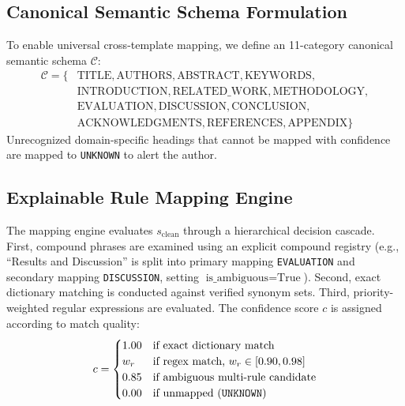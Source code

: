 \documentclass[conference]{IEEEtran}
\begin{document}
\subsection{Canonical Semantic Schema Formulation}
To enable universal cross-template mapping, we define an 11-category canonical semantic schema $\mathcal{C}$:
\begin{align*}
\mathcal{C} = \{&\text{TITLE}, \text{AUTHORS}, \text{ABSTRACT}, \text{KEYWORDS}, \\
&\text{INTRODUCTION}, \text{RELATED\_WORK}, \text{METHODOLOGY}, \\
&\text{EVALUATION}, \text{DISCUSSION}, \text{CONCLUSION}, \\
&\text{ACKNOWLEDGMENTS}, \text{REFERENCES}, \text{APPENDIX}\}
\end{align*}
Unrecognized domain-specific headings that cannot be mapped with confidence are mapped to \texttt{UNKNOWN} to alert the author.

\subsection{Explainable Rule Mapping Engine}
The mapping engine evaluates $s_{\text{clean}}$ through a hierarchical decision cascade. First, compound phrases are examined using an explicit compound registry (e.g., ``Results and Discussion'' is split into primary mapping \texttt{EVALUATION} and secondary mapping \texttt{DISCUSSION}, setting $\text{is\_ambiguous} = \text{True}$). Second, exact dictionary matching is conducted against verified synonym sets. Third, priority-weighted regular expressions are evaluated. The confidence score $c$ is assigned according to match quality:
\begin{equation}
c = \begin{cases} 
1.00 & \text{if exact dictionary match} \\
w_r  & \text{if regex match, } w_r \in [0.90, 0.98] \\
0.85 & \text{if ambiguous multi-rule candidate} \\
0.00 & \text{if unmapped (\texttt{UNKNOWN})}
\end{cases}
\end{equation}
\end{document}
